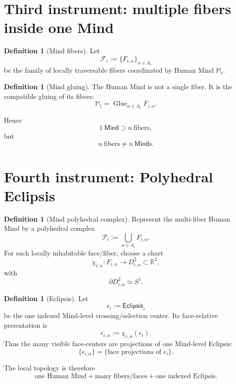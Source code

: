 \documentclass[10pt]{article}
\theoremstyle{pe}
\theoremstyle{definition}
\newtheorem{definition}[theorem]{Definition}
\newcommand{\Glue}{\operatorname{Glue}}
\newcommand{\Eclipsis}{\mathsf{Eclipsis}}
\newcommand{\Mind}{\mathsf{Mind}}
\begin{document}
\section{Third instrument: multiple fibers inside one Mind}

\begin{definition}[Mind fibers]
Let
\[
  \mathcal F_i:=\{F_{i,\alpha}\}_{\alpha\in A_i}
\]
be the family of locally traversable fibers coordinated by Human Mind \(\mathbb M_i\).
\end{definition}

\begin{definition}[Mind gluing]
The Human Mind is not a single fiber.  It is the compatible gluing of its fibers:
\begin{equation}\label{eq:mind-glue}
  \boxed{
  \mathbb M_i
  =
  \Glue_{\alpha\in A_i}F_{i,\alpha}.
  }
\end{equation}
\end{definition}

Hence
\[
  1\ \Mind
  \supset
  n\ \text{fibers},
\]
but
\[
  n\ \text{fibers}\neq n\ \Mind\text{s}.
\]

\section{Fourth instrument: Polyhedral Eclipsis}

\begin{definition}[Mind polyhedral complex]
Represent the multi-fiber Human Mind by a polyhedral complex
\[
  \mathcal P_i
  :=
  \bigcup_{\alpha\in A_i}F_{i,\alpha}.
\]
For each locally inhabitable face/fiber, choose a chart
\[
  \chi_{i,\alpha}:F_{i,\alpha}\longrightarrow D^2_{i,\alpha}\subset\mathbb R^2,
\]
with
\[
  \partial D^2_{i,\alpha}\simeq S^1.
\]
\end{definition}

\begin{definition}[Eclipsis]
Let
\[
  \epsilon_i:=\Eclipsis_i
\]
be the one indexed Mind-level crossing/selection center.  Its face-relative presentation is
\[
  \epsilon_{i,\alpha}:=\chi_{i,\alpha}(\epsilon_i).
\]
Thus the many visible face-centers are projections of one Mind-level Eclipsis:
\[
  \{\epsilon_{i,\alpha}\}
  =
  \{\text{face projections of }\epsilon_i\}.
\]
\end{definition}

The local topology is therefore
\[
  \boxed{
  \text{one Human Mind}
  +
  \text{many fibers/faces}
  +
  \text{one indexed Eclipsis}.
  }
\]
\end{document}
